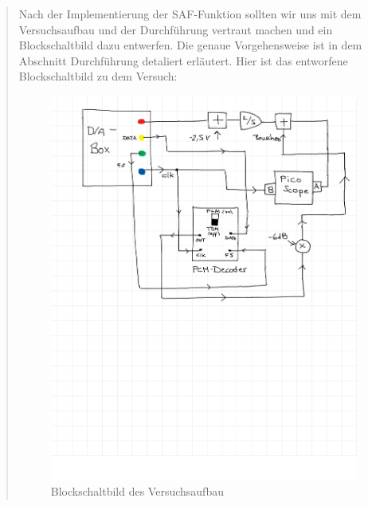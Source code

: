 \begin{quote}
    
    Nach der Implementierung der SAF-Funktion sollten wir uns mit dem
    Versuchsaufbau und der Durchführung vertraut machen und  ein Blockschaltbild
    dazu entwerfen. Die genaue Vorgehensweise ist in dem Abschnitt Durchführung
    detaliert erläutert. Hier ist das entworfene Blockschaltbild zu dem Versuch:\\
    
    \begin{figure}[H]
        \centering
            \includegraphics[scale=0.45, trim = 1.5cm 15cm 1cm 0cm,
            clip]{./Bilder/Blockschaltbild.png}
                \caption{Blockschaltbild des Versuchsaufbau}
        \end{figure}
        

\end{quote}
